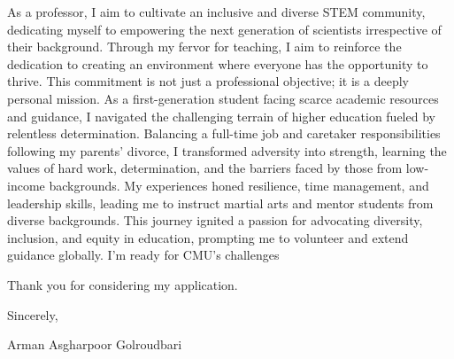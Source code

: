 \documentclass[a4,20pt]{article}
\begin{document}
\begin{large}
As a professor, I aim to cultivate an inclusive and diverse STEM community, dedicating myself to empowering the next generation of scientists irrespective of their background. Through my fervor for teaching, I aim to reinforce the dedication to creating an environment where everyone has the opportunity to thrive. This commitment is not just a professional objective; it is a deeply personal mission. As a first-generation student facing scarce academic resources and guidance, I navigated the challenging terrain of higher education fueled by relentless determination. Balancing a full-time job and caretaker responsibilities following my parents' divorce, I transformed adversity into strength, learning the values of hard work, determination, and the barriers faced by those from low-income backgrounds. My experiences honed resilience, time management, and leadership skills, leading me to instruct martial arts and mentor students from diverse backgrounds. This journey ignited a passion for advocating diversity, inclusion, and equity in education, prompting me to volunteer and extend guidance globally.  I’m ready for CMU’s challenges

\vspace{0.05cm}
Thank you for considering my application.\vspace{-0.1cm}

Sincerely, \vspace{-0.1cm}

Arman Asgharpoor Golroudbari


\end{large}
\end{document}
